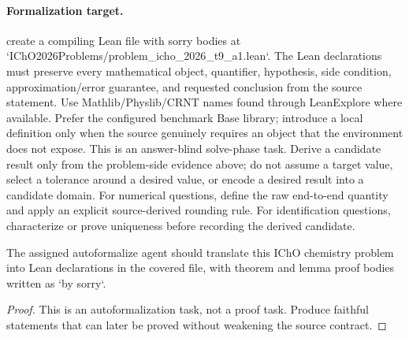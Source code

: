 \paragraph{Formalization target.}
create a compiling Lean file with sorry bodies at `IChO2026Problems/problem\_icho\_2026\_t9\_a1.lean`.
The Lean declarations must preserve every mathematical object, quantifier, hypothesis, side condition, approximation/error guarantee, and requested conclusion from the source statement.
Use Mathlib/Physlib/CRNT names found through LeanExplore where available. Prefer the configured benchmark Base library; introduce a local definition only when the source genuinely requires an object that the environment does not expose.
This is an answer-blind solve-phase task. Derive a candidate result only from the problem-side evidence above; do not assume a target value, select a tolerance around a desired value, or encode a desired result into a candidate domain.
For numerical questions, define the raw end-to-end quantity and apply an explicit source-derived rounding rule. For identification questions, characterize or prove uniqueness before recording the derived candidate.

\begin{theorem}
\label{thm:physics:icho_2026_t9_a1:target}
The assigned autoformalize agent should translate this IChO chemistry problem into Lean declarations in the covered file, with theorem and lemma proof bodies written as `by sorry`.
\end{theorem}
\begin{proof}
This is an autoformalization task, not a proof task. Produce faithful statements that can later be proved without weakening the source contract.
\end{proof}
